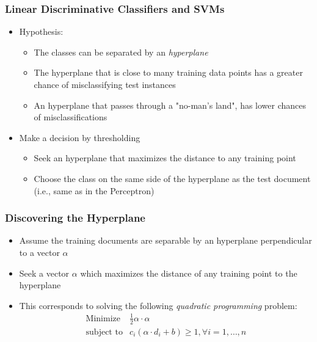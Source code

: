 \documentclass{beamer}
\begin{document}

\begin{frame} \frametitle{Linear Discriminative Classifiers and SVMs}
  
  \begin{itemize}
  \item Hypothesis:
    \begin{itemize}
    \item The classes can be separated by an \emph{hyperplane}
    \item The hyperplane that is close to many training data points has a greater chance of misclassifying test instances
    \item An hyperplane that passes through a "no-man's land", has lower chances of misclassifications
    \end{itemize}
  \item Make a decision by thresholding
    \begin{itemize}
    \item Seek an hyperplane that maximizes the distance to any training point
    \item Choose the class on the same side of the hyperplane as the test
      document (i.e., same as in the Perceptron)
    \end{itemize}
  \end{itemize}

\end{frame}


\begin{frame} \frametitle{Discovering the Hyperplane}
  
  \begin{itemize}
  \item Assume the training documents are separable by an hyperplane
    perpendicular to a vector $\alpha$
  \item Seek a vector $\alpha$ which maximizes the distance of any training point to
    the hyperplane
  \item This corresponds to solving the following \emph{quadratic programming} problem:
    \begin{displaymath}
      \begin{array}{rl}
        \text{Minimize} & \frac{1}{2}\alpha\cdot\alpha \\
        \text{subject to} & c_i(\alpha\cdot d_i + b) \geq 1, \forall i = 1,
        \dotsc, n
      \end{array}
    \end{displaymath}
  \end{itemize}

\end{frame}
\end{document}
